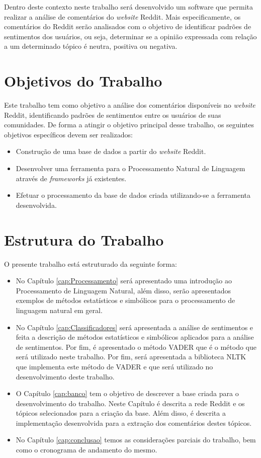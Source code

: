 Dentro deste contexto neste trabalho será desenvolvido um software que permita
realizar a análise de comentários do \textit{website} Reddit. Mais
especificamente, os comentários do Reddit serão analisados com o objetivo de
identificar padrões de sentimentos dos usuários, ou seja, determinar se a
opinião expressada com relação a um determinado tópico é neutra, positiva ou negativa.

\section{Objetivos do Trabalho}

Este trabalho tem como objetivo a análise dos comentários disponíveis no
\textit{website} Reddit, identificando padrões de sentimentos entre os
usuários de suas comunidades. De forma a atingir o objetivo principal desse
trabalho, os seguintes objetivos específicos devem ser realizados:
\begin{itemize}
  
 \item Construção de uma base de dados a partir do \textit{website} Reddit.
 \item Desenvolver uma ferramenta para o Processamento Natural de Linguagem
 através de \textit{frameworks} já existentes.
 \item Efetuar o processamento da base de dados criada utilizando-se a
 ferramenta desenvolvida.
\end{itemize}

\section{Estrutura do Trabalho}

O presente trabalho está estruturado da seguinte forma: 
\begin{itemize}
  \item No Capítulo \ref{cap:Processamento} será apresentado uma introdução ao
  Processamento de Linguagem Natural, além disso, serão apresentados exemplos de
  métodos estatísticos e simbólicos para o processamento de linguagem natural
  em geral.
  \item No Capítulo \ref{cap:Classificadores} será
  apresentada a análise de sentimentos e feita a descrição de métodos
  estatísticos e simbólicos aplicados para a análise de sentimentos. Por fim, é apresentado o
  método \ac{VADER} que é o método que será utilizado neste trabalho. Por fim,
  será apresentada a biblioteca \ac{NLTK} que implementa este método de
  \ac{VADER} e que será utilizado no desenvolvimento deste trabalho.
  \item O Capítulo \ref{cap:banco} tem
o objetivo de descrever a base criada para o desenvolvimento do trabalho.
Neste Capítulo é descrita a rede Reddit e os tópicos selecionados para a criação
da base. Além disso, é descrita a implementação desenvolvida para a extração dos
comentários destes tópicos.
\item No Capítulo \ref{cap:conclusao} temos as considerações parciais do
trabalho, bem como o cronograma de andamento do mesmo.
\end{itemize}

